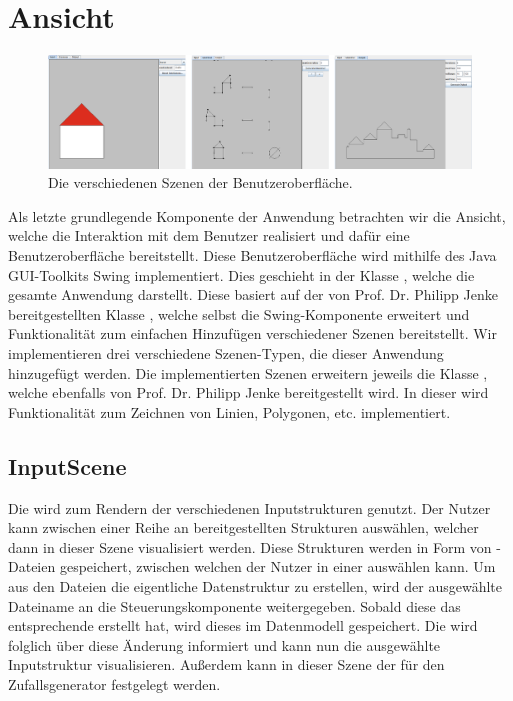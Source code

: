 \section{Ansicht}

\begin{figure}[h]
    \centering
    \includegraphics[width=\textwidth]{images/scenes.pdf}
    \caption{Die verschiedenen Szenen der Benutzeroberfläche.}
    \label{fig:scenes}
\end{figure}

Als letzte grundlegende Komponente der Anwendung betrachten wir die Ansicht, welche die Interaktion mit dem Benutzer realisiert und
dafür eine Benutzeroberfläche bereitstellt. Diese Benutzeroberfläche wird mithilfe des Java GUI-Toolkits Swing implementiert. Dies geschieht
in der Klasse , welche die gesamte Anwendung darstellt. Diese basiert auf der von Prof. Dr. Philipp Jenke
bereitgestellten Klasse , welche selbst die Swing-Komponente  erweitert und
Funktionalität zum einfachen Hinzufügen verschiedener Szenen bereitstellt. Wir implementieren drei verschiedene Szenen-Typen,
die dieser Anwendung hinzugefügt werden. Die implementierten Szenen erweitern jeweils die Klasse , welche ebenfalls
von Prof. Dr. Philipp Jenke bereitgestellt wird. In dieser wird Funktionalität zum Zeichnen von Linien, Polygonen, etc. implementiert.

\subsection{InputScene}
Die  wird zum Rendern der verschiedenen Inputstrukturen genutzt. Der Nutzer kann zwischen
einer Reihe an bereitgestellten Strukturen auswählen, welcher dann in dieser Szene visualisiert werden. Diese Strukturen werden
in Form von -Dateien gespeichert, zwischen welchen der Nutzer in einer  auswählen kann. Um aus den
Dateien die eigentliche Datenstruktur zu erstellen, wird der ausgewählte Dateiname an die Steuerungskomponente weitergegeben.
Sobald diese das entsprechende  erstellt hat, wird dieses im Datenmodell gespeichert. Die 
wird folglich über diese Änderung informiert und kann nun die ausgewählte Inputstruktur visualisieren.
Außerdem kann in dieser Szene der  für den Zufallsgenerator festgelegt werden.

